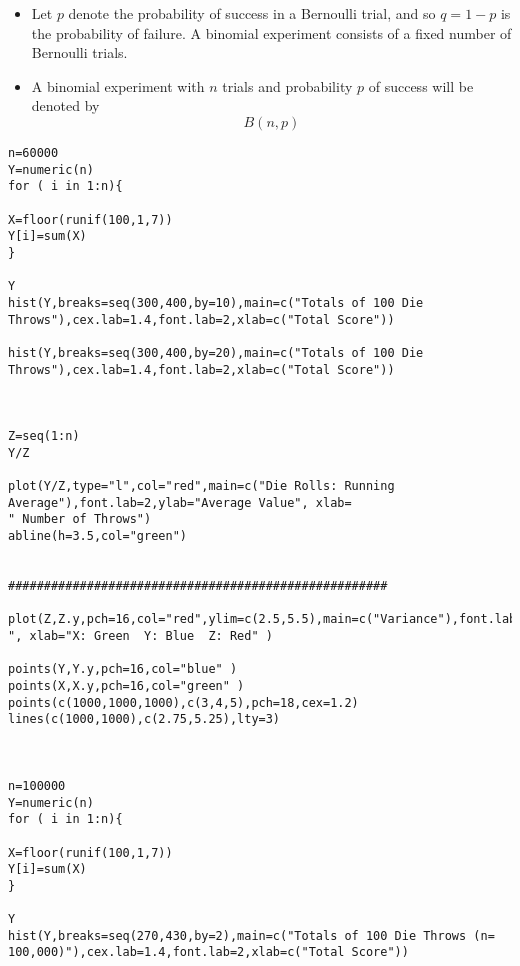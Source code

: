 \documentclass[]{report}
\begin{document}
{
\begin{itemize} \item
Let $p$ denote the probability of success in a Bernoulli trial, and so $q = 1 - p$ is the probability of failure.
A binomial experiment consists of a fixed number of Bernoulli trials. \item A binomial experiment with $n$ trials and
probability $p$ of success will be denoted by
\[B(n, p)\]
\end{itemize}
}


\begin{verbatim}
n=60000
Y=numeric(n)
for ( i in 1:n){

X=floor(runif(100,1,7))
Y[i]=sum(X)
}

Y
hist(Y,breaks=seq(300,400,by=10),main=c("Totals of 100 Die Throws"),cex.lab=1.4,font.lab=2,xlab=c("Total Score"))

hist(Y,breaks=seq(300,400,by=20),main=c("Totals of 100 Die Throws"),cex.lab=1.4,font.lab=2,xlab=c("Total Score"))



Z=seq(1:n)
Y/Z

plot(Y/Z,type="l",col="red",main=c("Die Rolls: Running Average"),font.lab=2,ylab="Average Value", xlab=
" Number of Throws")
abline(h=3.5,col="green")


#####################################################

plot(Z,Z.y,pch=16,col="red",ylim=c(2.5,5.5),main=c("Variance"),font.lab=2,ylab=" ", xlab="X: Green  Y: Blue  Z: Red" )

points(Y,Y.y,pch=16,col="blue" )
points(X,X.y,pch=16,col="green" )
points(c(1000,1000,1000),c(3,4,5),pch=18,cex=1.2)
lines(c(1000,1000),c(2.75,5.25),lty=3)



n=100000
Y=numeric(n)
for ( i in 1:n){

X=floor(runif(100,1,7))
Y[i]=sum(X)
}

Y
hist(Y,breaks=seq(270,430,by=2),main=c("Totals of 100 Die Throws (n= 100,000)"),cex.lab=1.4,font.lab=2,xlab=c("Total Score")) 
\end{verbatim}
\end{document}
